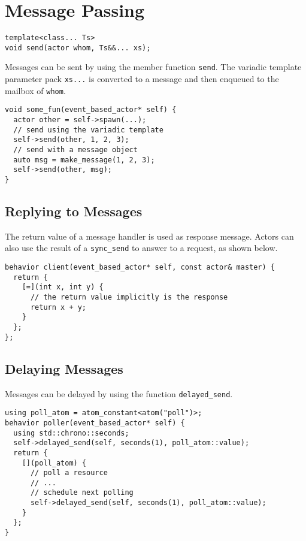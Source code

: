 \section{Message Passing}
\label{send}

\begin{lstlisting}
template<class... Ts>
void send(actor whom, Ts&&... xs);
\end{lstlisting}

Messages can be sent by using the member function \lstinline^send^.
The variadic template parameter pack \lstinline^xs...^ is converted to a message and then enqueued to the mailbox of \lstinline^whom^.

\begin{lstlisting}
void some_fun(event_based_actor* self) {
  actor other = self->spawn(...);
  // send using the variadic template
  self->send(other, 1, 2, 3);
  // send with a message object
  auto msg = make_message(1, 2, 3);
  self->send(other, msg);
}
\end{lstlisting}

\subsection{Replying to Messages}
\label{reply}

The return value of a message handler is used as response message.
Actors can also use the result of a \lstinline^sync_send^ to answer to a request, as shown below.

\begin{lstlisting}
behavior client(event_based_actor* self, const actor& master) {
  return {
    [=](int x, int y) {
      // the return value implicitly is the response
      return x + y;
    }
  };
};
\end{lstlisting}

\subsection{Delaying Messages}

Messages can be delayed by using the function \lstinline^delayed_send^.

\begin{lstlisting}
using poll_atom = atom_constant<atom("poll")>;
behavior poller(event_based_actor* self) {
  using std::chrono::seconds;
  self->delayed_send(self, seconds(1), poll_atom::value);
  return {
    [](poll_atom) {
      // poll a resource
      // ...
      // schedule next polling
      self->delayed_send(self, seconds(1), poll_atom::value);
    }
  };
}
\end{lstlisting}

